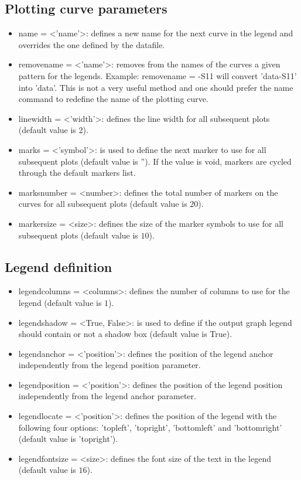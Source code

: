 \subsection{Plotting curve parameters}
\begin{itemize}
\item \textsf{name} = <'name'>: defines a new name for the next curve in
the legend and overrides the one defined by the datafile.
\item \textsf{removename} = <'name'>: removes from the names of the curves
a given pattern for the legends. Example: \textsf{removename} = -S11
will convert 'data-S11' into 'data'. This is not a very useful method
and one should prefer the \textsf{name} command to redefine the name
of the plotting curve.
\item \textsf{linewidth} = <'width'>: defines the line width for all subsequent
plots (default value is $2$). 
\item \textsf{marks} = <'symbol'>: is used to define the next marker to
use for all subsequent plots (default value is ''). If the value is
void, markers are cycled through the default markers list.
\item \textsf{marksnumber} = <number>: defines the total number of markers
on the curves for all subsequent plots (default value is $20$).
\item \textsf{markersize} = <size>: defines the size of the marker symbols
to use for all subsequent plots (default value is $10$).
\end{itemize}

\subsection{Legend definition}
\begin{itemize}
\item \textsf{legendcolumns} = <columns>: defines the number of columns
to use for the legend (default value is $1$).
\item \textsf{legendshadow} = <True, False>: is used to define if the output
graph legend should contain or not a shadow box (default value is
True).
\item \textsf{legendanchor} = <'position'>: defines the position of the
legend anchor independently from the legend position parameter.
\item \textsf{legendposition} = <'position'>: defines the position of the
legend position independently from the legend anchor parameter.
\item \textsf{legendlocate} = <'position'>: defines the position of the
legend with the following four options: 'topleft', 'topright', 'bottomleft'
and 'bottomright' (default value is 'topright').
\item \textsf{legendfontsize} = <size>: defines the font size of the text
in the legend (default value is $16$).
\end{itemize}


